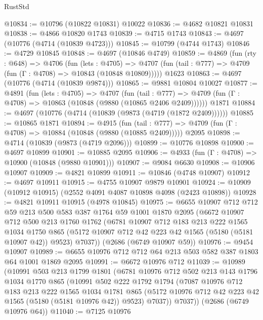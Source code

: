 \begin{lexlean}{RustStd}
\begin{coremodule}
@10834 := @10796 (@10822 @10831) @10022
@10836 := @4682 @10821 @10831
@10838 := @4866 @10820 @1743
@10839 := @4715 @1743
@10843 := @4697 (@10776 (@4714 (@10839 @4723)))
@10845 := @10799 (@4744 @1743)
@10846 := @4729 @10845
@10848 := @4697 (@10846 @4749)
@10859 := @4869
    (fun (rty : @648) =>
    @4706
      (fun (lets : @4705) =>
      @4707 (fun (tail : @777) => @4709 (fun (Γ : @4708) => @10843 (@10848 @10809)))))
    @1623
@10863 := @4697 (@10776 (@4714 (@10839 @9874)))
@10865 := @9881 @10804 @10027
@10877 := @4891
    (fun (lets : @4705) =>
    @4707
      (fun (tail : @777) =>
      @4709 (fun (Γ : @4708) => @10863 (@10848 (@9880 (@10865 @2406 @2409))))))
    @1871
@10884 := @4697 (@10776 (@4714 (@10839 (@9873 (@4719 (@1872 @2409))))))
@10885 := @10865 @1871
@10894 := @4915
    (fun (tail : @777) => @4709 (fun (Γ : @4708) => @10884 (@10848 (@9880 (@10885 @2409)))))
    @2095
@10898 := @4714 (@10839 (@9873 (@4719 @2096)))
@10899 := @10776 @10898
@10900 := @4697 @10899
@10901 := @10885 @2095
@10906 := @4933 (fun (Γ : @4708) => @10900 (@10848 (@9880 @10901)))
@10907 := @9084 @6630
@10908 := @10906 @10907
@10909 := @4821 @10899
@10911 := @10846 (@4748 @10907)
@10912 := @4697 @10911
@10915 := @4755 @10907 @9879 @10901
@10924 := @10909 (@10912 @10915) (@2552 @4091 @4087 @10898 @4098 (@2423 @10898))
@10928 := @4821 @10911 @10915 (@4978 @10845)
@10975 := @6655
    @10907
    @712
    @712
    @59
    @213
    @500
    @583
    @387
    @1764
    @59
    @1001
    @1870
    @2095
    (@6672
      @10907
      @712
      @500
      @213
      @1760
      @1762
      (@6781
        @10907
        @712
        @183
        @213
        @222
        @1565
        @1034
        @1750
        @865
        (@5172 @10907 @712 @42 @223 @42 @1565 (@5180 (@5181 @10907 @42)) @9523)
        @7037))
    (@2686 (@6749 @10907 @59))
@10976 := @9454 @10907
@10989 := @6655 @10976 @712 @712 @64 @213 @503 @582 @387 @1803 @64 @1001 @1869 @2095
@10991 := @6672 @10976 @712
@11039 := @10989
    (@10991
      @503
      @213
      @1799
      @1801
      (@6781
        @10976
        @712
        @502
        @213
        @143
        @1796
        @1034
        @1770
        @865
        (@10991
          @502
          @222
          @1792
          @1794
          (@7087
            @10976
            @712
            @183
            @213
            @222
            @1565
            @1034
            @1781
            @865
            (@5172 @10976 @712 @42 @223 @42 @1565 (@5180 (@5181 @10976 @42)) @9523)
            @7037))
        @7037))
    (@2686 (@6749 @10976 @64))
@11040 := @7125 @10976

\end{coremodule}
\end{lexlean}
